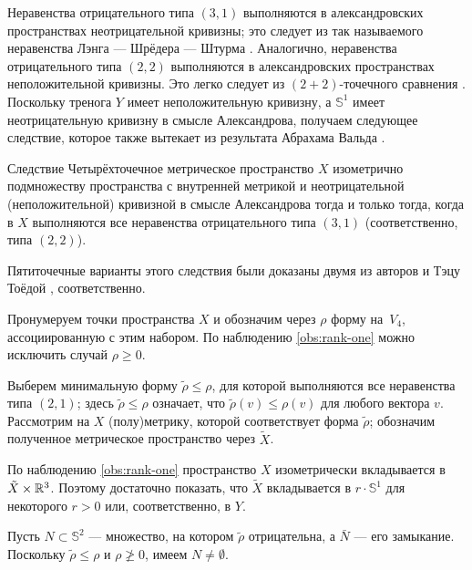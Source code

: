 Неравенства отрицательного типа $(3, 1)$ выполняются в александровских пространствах неотрицательной кривизны; это следует из так называемого неравенства Лэнга --- Шрёдера --- Штурма \cite{lang-schroeder, sturm}.
Аналогично, неравенства отрицательного типа $(2, 2)$ выполняются в александровских пространствах неположительной кривизны.
Это легко следует из $(2+2)$-точечного сравнения \cite[9.5]{AKP-2024}.
Поскольку тренога $Y$ имеет неположительную кривизну, а $\mathbb{S}^1$ имеет неотрицательную кривизну в смысле Александрова, получаем следующее следствие, которое также вытекает из результата Абрахама Вальда \cite[§ 7]{wald}.

\begin{thm}{Следствие}\label{cor:Four-point arrays}
Четырёхточечное метрическое пространство $X$ изометрично подмножеству пространства с внутренней метрикой и неотрицательной (неположительной) кривизной в смысле Александрова тогда и только тогда, когда в $X$ выполняются все неравенства отрицательного типа $(3, 1)$ (соответственно, типа $(2, 2)$).
\end{thm}

Пятиточечные варианты этого следствия были доказаны двумя из авторов \cite{lebedeva-petrunin-2024} и Тэцу Тоёдой \cite{toyoda,lebedeva-petrunin2021}, соответственно.

Пронумеруем точки пространства $X$ и обозначим через $\rho$ форму на~$V_4$, ассоциированную с этим набором.
По наблюдению \ref{obs:rank-one} можно исключить случай $\rho\geqslant 0$.

Выберем минимальную форму $\tilde\rho\leqslant \rho$, для которой выполняются все неравенства типа $(2,1)$;
здесь $\tilde\rho\leqslant \rho$ означает, что $\tilde\rho(v)\leqslant \rho(v)$ для любого вектора $v$.
Рассмотрим на $X$ (полу)метрику, которой соответствует форма $\tilde\rho$;
обозначим полученное метрическое пространство через $\tilde X$.

По наблюдению \ref{obs:rank-one} пространство $X$ изометрически вкладывается в $\tilde X\times \mathbb{R}^3$.
Поэтому достаточно показать, что $\tilde X$ вкладывается в $r\cdot \mathbb{S}^1$ для некоторого $r>0$ или, соответственно, в $Y$.

Пусть $N\subset \mathbb{S}^2$ --- множество, на котором $\tilde\rho$ отрицательна, а $\bar N$ --- его замыкание.
Поскольку $\tilde\rho\leqslant \rho$ и $\rho\ngeqslant0$, имеем $N\ne \emptyset$.

